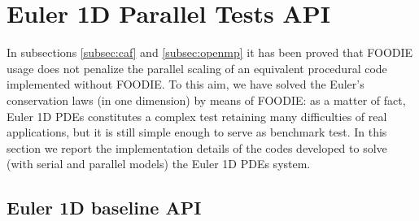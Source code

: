 \section{Euler 1D Parallel Tests API}

In subsections \ref{subsec:caf} and \ref{subsec:openmp} it has been proved that FOODIE usage does not penalize the parallel scaling of an equivalent procedural code implemented without FOODIE. To this aim, we have solved the Euler's conservation laws (in one dimension) by means of FOODIE: as a matter of fact, Euler 1D PDEs constitutes a complex test retaining many difficulties of real applications, but it is still simple enough to serve as benchmark test. In this section we report the implementation details of the codes developed to solve (with serial and parallel models) the Euler 1D PDEs system.

\subsection{Euler 1D baseline API}\label{subsec:euler-1D-API}

